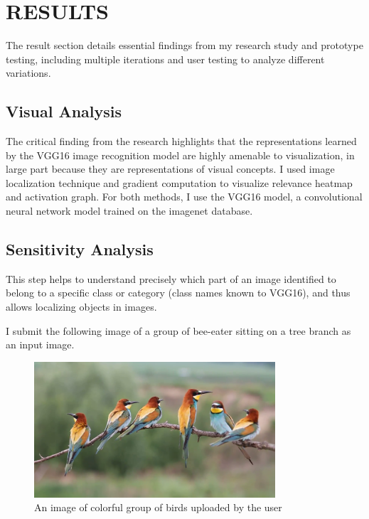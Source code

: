 \chapter{RESULTS}

\graphicspath{ {./results/} }
\thispagestyle{empty}


The result section details essential findings from my research study and prototype testing, including multiple iterations and user testing to analyze different variations.

\section{Visual Analysis}

The critical finding from the research highlights that the representations learned by the VGG16 image recognition model are highly amenable to visualization, in large part because they are representations of visual concepts. I used image localization technique and gradient computation to visualize relevance heatmap and activation graph. For both methods, I use the VGG16 model, a convolutional neural network model trained on the imagenet database.

\section*{Sensitivity Analysis}

This step helps to understand precisely which part of an image identified to belong to a specific class or category (class names known to VGG16), and thus allows localizing objects in images.

I submit the following image of a group of bee-eater sitting on a tree branch as an input image.

\begin{figure}[htbp]
\centering
\includegraphics[width=0.80\textwidth]{images/colorful-group-of-birds-get-together_vkmuak6_e__F0000.png}
\caption{An image of colorful group of birds uploaded by the user}
\label{fig:myFig}
\end{figure}

